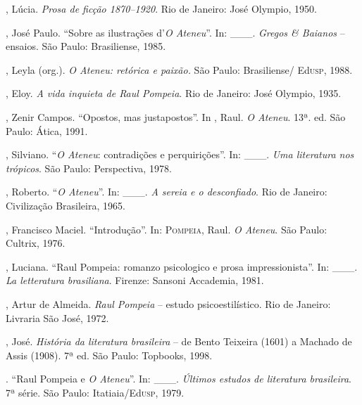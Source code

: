 \begin{bibliohedra}
, Lúcia. \textit{Prosa de ficção 1870--1920}. Rio de
Janeiro: José Olympio, 1950. 

, José Paulo. ``Sobre as ilustrações d'\textit{O
Ateneu}''. In: \_\_\_. \textit{Gregos \& Baianos} -- ensaios. São Paulo:
Brasiliense, 1985.

, Leyla (org.). \textit{O Ateneu: retórica e paixão.}
São Paulo: Brasiliense/ Ed\textsc{usp}, 1988.

, Eloy. \textit{A vida inquieta de Raul Pompeia}.
Rio de Janeiro: José Olympio, 1935.

, Zenir Campos. ``Opostos, mas justapostos''. In
, Raul. \textit{O Ateneu}. 13ª. ed. São Paulo:
Ática, 1991.

, Silviano. ``\textit{O Ateneu}: contradições e perquirições''.
In: \_\_\_. \textit{Uma literatura nos trópicos}. São Paulo:
Perspectiva, 1978.

, Roberto. ``\textit{O Ateneu}''. In: \_\_\_. \textit{A sereia e o
desconfiado}. Rio de Janeiro: Civilização Brasileira, 1965. 

, Francisco Maciel. ``Introdução''. In:
\textsc{Pompeia}, Raul. \textit{O Ateneu}. São Paulo: Cultrix, 1976.

, Luciana. ``Raul Pompeia: romanzo
psicologico e prosa impressionista''. In: \_\_\_. \textit{La letteratura
brasiliana}. Firenze: Sansoni Accademia, 1981.

, Artur de Almeida. \textit{Raul Pompeia} -- estudo
psicoestilístico. Rio de Janeiro: Livraria São José, 1972.

, José. \textit{História da literatura
brasileira } -- de Bento Teixeira (1601) a Machado de
Assis (1908). 7ª 
ed. São Paulo: Topbooks, 1998. 

\titidem. ``Raul Pompeia e \textit{O Ateneu}''. In: \_\_\_.
\textit{Últimos estudos de literatura brasileira}. 7ª
série. São Paulo: Itatiaia/Ed\textsc{usp}, 1979.
\end{bibliohedra}